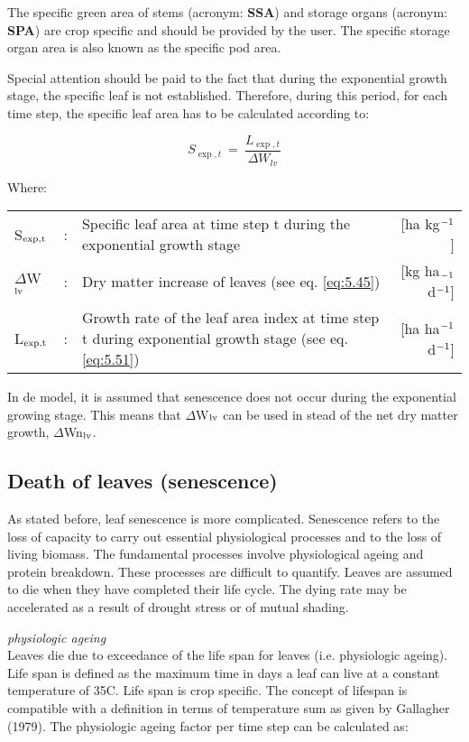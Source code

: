 The specific green area of stems (acronym: {\bf SSA}) and storage organs (acronym: {\bf SPA}) are
crop specific and should be provided by the user. The specific storage organ area is also
known as the specific pod area.

Special attention should be paid to the fact that during the exponential growth stage, the
specific leaf is not established. Therefore, during this period, for each time step, the
specific leaf area has to be calculated according to:

\begin{equation}
S_{\exp,t} ~=~ {\frac{L_{\exp,t}}{\Delta W_{lv} }}
\end{equation}

Where:\\[5pt]
\begin{tabularx}{\textwidth}{llXr}
	S$_{{\rm exp,t}}$ &:& Specific leaf area at time step t during the 
	exponential growth stage    &     [ha kg$^{{\rm -1}}$]\\
	$\Delta$W$_{{\rm lv}}$ &:& Dry matter increase of leaves (see eq. \ref{eq:5.45})   &
	[kg ha$_{{\rm -1}}$ d$^{{\rm -1}}$]\\
	L$_{{\rm \exp,t}}$ &:& Growth rate of the leaf area index at time step t
	during exponential growth stage (see eq. \ref{eq:5.51})   &
	[ha ha$^{{\rm -1}}$ d$^{{\rm -1}}$]\\
\end{tabularx}

In de model, it is assumed that senescence does not occur during the exponential growing
stage. This means that $\Delta$W$_{{\rm lv}}$ can be used in stead of the net dry matter 
growth, $\Delta$Wn$_{{\rm lv}}$.

\subsection{Death of leaves (senescence)}
As stated before, leaf senescence is more complicated. Senescence refers to the loss of
capacity to carry out essential physiological processes and to the loss of living biomass.
The fundamental processes involve physiological ageing and protein breakdown. These
processes are difficult to quantify. Leaves are assumed to die when they have completed
their life cycle. The dying rate may be accelerated as a result of drought stress or of
mutual shading.

{\it physiologic ageing}\\
Leaves die due to exceedance of the life span for leaves (i.e. physiologic ageing). Life
span is defined as the maximum time in days a leaf can live at a constant temperature of
35\degrees C. Life span is crop specific. The concept of lifespan is compatible with a definition
in terms of temperature sum as given by Gallagher (1979).
The physiologic ageing factor per time step can be calculated as:

